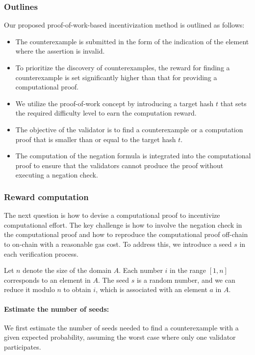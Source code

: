 \documentclass[runningheads]{llncs}
\begin{document}
\subsubsection{Outlines}
Our proposed proof-of-work-based incentivization method is outlined as follows:
\begin{itemize}
\item The counterexample is submitted in the form of the indication of the element where the assertion is invalid.
\item To prioritize the discovery of counterexamples, the reward for finding a counterexample is set significantly higher than that for providing a computational proof.
\item We utilize the proof-of-work concept by introducing a target hash \( t \) that sets the required difficulty level to earn the computation reward.
\item The objective of the validator is to find a counterexample or a computation proof that is smaller than or equal to the target hash \( t \).
\item The computation of the negation formula is integrated into the computational proof to ensure that the validators cannot produce the proof without executing a negation check.
\end{itemize}
\subsubsection{Reward computation}
The next question is how to devise a computational proof to incentivize computational effort. The key challenge is how to involve the negation check in the computational proof and how to reproduce the computational proof off-chain to on-chain with a reasonable gas cost. To address this, we introduce a seed $s$ in each verification process.

Let \( n \) denote the size of the domain \( A \). Each number \( i \) in the range \([1, n]\) corresponds to an element in \( A \). The seed \( s \) is a random number, and we can reduce it modulo \( n \) to obtain \( i \), which is associated with an element \( a \) in \( A \).

\paragraph{Estimate the number of seeds:} We first estimate the number of seeds needed to find a counterexample with a given expected probability, assuming the worst case where only one validator participates.
\end{document}
